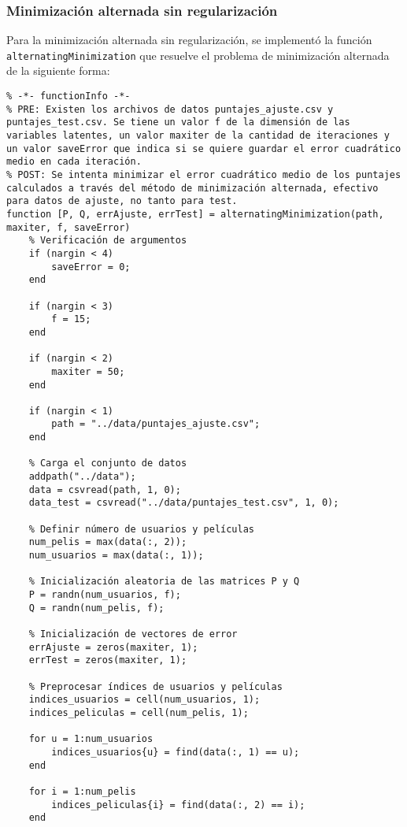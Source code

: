 \documentclass[12pt,a4paper]{article}
\begin{document}
\subsubsection*{Minimización alternada sin regularización}

Para la minimización alternada sin regularización, se implementó la función\\ \texttt{alternatingMinimization} que resuelve el problema de minimización alternada de la siguiente forma:

\begin{lstlisting}
% -*- functionInfo -*-
% PRE: Existen los archivos de datos puntajes_ajuste.csv y puntajes_test.csv. Se tiene un valor f de la dimensión de las variables latentes, un valor maxiter de la cantidad de iteraciones y un valor saveError que indica si se quiere guardar el error cuadrático medio en cada iteración.
% POST: Se intenta minimizar el error cuadrático medio de los puntajes calculados a través del método de minimización alternada, efectivo para datos de ajuste, no tanto para test. 
function [P, Q, errAjuste, errTest] = alternatingMinimization(path, maxiter, f, saveError)
    % Verificación de argumentos
    if (nargin < 4)
        saveError = 0;
    end

    if (nargin < 3)
        f = 15;
    end

    if (nargin < 2)
        maxiter = 50;
    end

    if (nargin < 1)
        path = "../data/puntajes_ajuste.csv";
    end

    % Carga el conjunto de datos
    addpath("../data");
    data = csvread(path, 1, 0);
    data_test = csvread("../data/puntajes_test.csv", 1, 0);

    % Definir número de usuarios y películas
    num_pelis = max(data(:, 2));
    num_usuarios = max(data(:, 1));

    % Inicialización aleatoria de las matrices P y Q
    P = randn(num_usuarios, f);
    Q = randn(num_pelis, f);

    % Inicialización de vectores de error
    errAjuste = zeros(maxiter, 1);
    errTest = zeros(maxiter, 1);

    % Preprocesar índices de usuarios y películas
    indices_usuarios = cell(num_usuarios, 1);
    indices_peliculas = cell(num_pelis, 1);

    for u = 1:num_usuarios
        indices_usuarios{u} = find(data(:, 1) == u);
    end

    for i = 1:num_pelis
        indices_peliculas{i} = find(data(:, 2) == i);
    end


\end{lstlisting}
\end{document}
